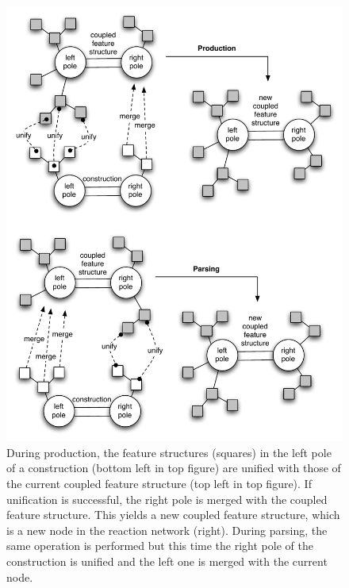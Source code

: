 \begin{figure}[p]
\centerline{\includegraphics[width=0.8\linewidth]{Chapter2/figs/unify}}
 \caption[Unifying and merging a construction]{During production, the feature structures (squares) in the left pole of a construction (bottom left in top figure) are unified with those of the current coupled feature structure (top left in top figure). If unification is successful, the right pole is merged with the coupled feature structure. This yields a new coupled feature structure, which is a new node in the reaction network (right). During parsing, the same operation is performed but this time the right pole of the construction is unified and the left one is merged with the current node.}
   \label{f:unify}
\end{figure}

\vspace{0.3cm}
